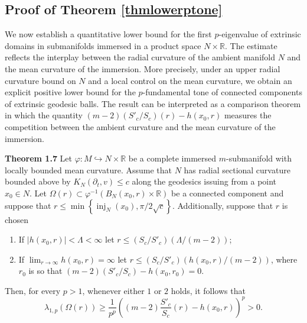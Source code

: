 \documentclass{article}
\begin{document}
\subsection{Proof of Theorem \ref{thmlowerptone}}

We now establish a quantitative lower bound for the first $p$-eigenvalue of extrinsic domains in submanifolds immersed in a product space $N \times \mathbb{R}$.  The estimate reflects the interplay between the radial curvature of the ambient manifold $N$ and the mean curvature of the immersion. More precisely, under an upper radial curvature bound on $N$ and a local control on the mean curvature, we obtain an explicit positive lower bound for the $p$-fundamental tone of connected components of extrinsic geodesic balls. The result can be interpreted as a comparison theorem in which the quantity $(m-2)(S'_c/S_c)(r) - h(x_0,r)$ measures the competition between the ambient curvature and the mean curvature of the immersion.
\medskip

\noindent \textbf{Theorem 1.7}
Let $\varphi\colon M \hookrightarrow N \times \mathbb{R}$ be a complete immersed $m$-submanifold with locally bounded mean curvature. Assume that $N$ has radial sectional curvature bounded above by $K_N(\partial_t,v) \leq c$ along the geodesics issuing from a point $x_0\in N$. Let $\Omega(r)\subset \varphi^{-1}\left(B_N(x_0,r)\times\mathbb{R}\right)$ be a connected component and suppose that $r \leq \min \left\{\operatorname{inj}_N(x_0), \pi/2\sqrt{c} \right\}$. Additionally, suppose that $r$ is chosen
\begin{enumerate}
\item If $|h(x_0,r)|< \Lambda < \infty$ let $r \leq (S_c / S'_c)(\Lambda/(m-2))$;
\item If $\displaystyle \lim_{r \to \infty}h(x_0,r) = \infty$ let $r \leq (S_c / S'_c)(h(x_0,r)/(m-2))$, where $r_0$ is so that $(m-2)(S'_c/S_c)-h(x_0,r_0)=0.$
\end{enumerate}
Then, for every $p>1$, whenever either $1$ or $2$ holds, it follows that
\begin{equation}\label{lowestimateptone}
 \lambda_{1,p}(\Omega(r)) \geq    \frac{1}{p^{p}}
\left((m-2)\frac{S'_c}{S_c}(r)-h(x_0,r)\right)^{p} > 0.
\end{equation}
\end{document}
